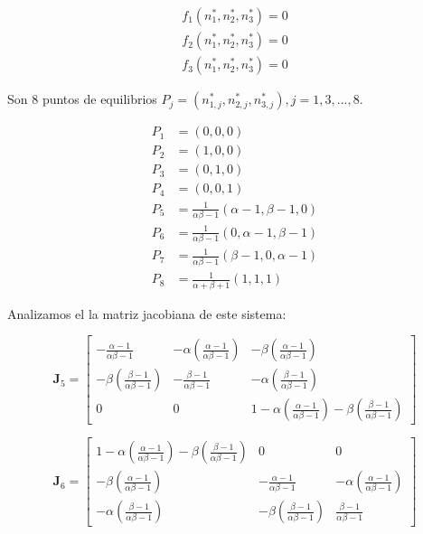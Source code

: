 \documentclass[twocolumn,aps,prl]{revtex4-1}
\newcommand{\nstar}{n^*}
\newcommand{\talf}{\frac{\alpha - 1}{\alpha \beta - 1} }
\newcommand{\tbet}{\frac{\beta  - 1}{\alpha \beta - 1} }
\begin{document}
$$
\begin{aligned}
    f_1(\nstar_1,\nstar_2,\nstar_3) = 0\\ 
    f_2(\nstar_1,\nstar_2,\nstar_3) = 0\\ 
    f_3(\nstar_1,\nstar_2,\nstar_3) = 0   
\end{aligned}
$$

Son 8 puntos de equilibrios $P_j = (\nstar_{1,j},\nstar_{2,j},\nstar_{3,j}), j= 1, 3, ..., 8$.

$$
\begin{aligned}
    P_1 &= (0, 0, 0) \\ 
    P_2 &= (1, 0, 0) \\ 
    P_3 &= (0, 1, 0) \\ 
    P_4 &= (0, 0, 1) \\  
    P_5 &= \frac{1}{\alpha \beta - 1} 
                       (\alpha - 1, \beta - 1 , 0) \\ 
    P_6 &= \frac{1}{\alpha \beta - 1} 
                       (0         , \alpha - 1, \beta - 1) \\ 
    P_7 &= \frac{1}{\alpha \beta - 1} 
                       (\beta - 1 , 0         , \alpha - 1) \\ 
    P_8 &= \frac{1}{\alpha + \beta + 1}(1, 1, 1) 
\end{aligned}
$$

Analizamos el la matriz jacobiana de este sistema:


$$
\mathbf{J}_5 = 
\begin{bmatrix}
    -\talf  & - \alpha (\talf)& - \beta (\talf)\\
    - \beta (\tbet) & -\tbet & - \alpha (\tbet) \\
    0 & 0 & 1 - \alpha (\talf) - \beta (\tbet)
\end{bmatrix}
$$

$$
\mathbf{J}_6 = 
\begin{bmatrix}
    1 - \alpha (\talf) - \beta (\tbet) & 0 & 0 \\
    - \beta (\talf) & -\talf & - \alpha (\talf) \\
    - \alpha (\tbet) & - \beta (\tbet) & \tbet
\end{bmatrix}
$$
\end{document}
